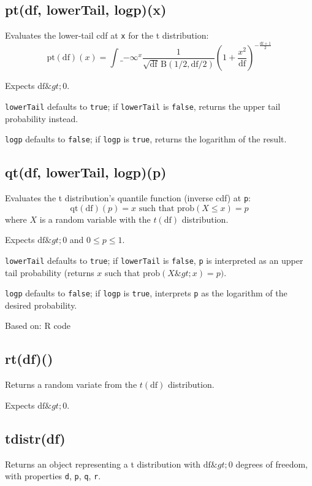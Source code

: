 \documentclass{article}
\begin{document}
    \subsection*{pt(df, lowerTail, logp)(x)}
    Evaluates the lower-tail cdf at \texttt{x} for the t distribution:
$$\textrm{pt}(\textrm{df})(x) = \int\_{-\infty}^{x} \frac{1}{\sqrt{\textrm{df}}\,\textrm{B}(1/2, \textrm{df}/2)} \left(1+\frac{x^2}{\textrm{df}} \right)^{-\frac{\textrm{df} + 1}{2}}$$


Expects $\textrm{df} \&gt; 0$.


\texttt{lowerTail} defaults to \texttt{true}; if \texttt{lowerTail} is \texttt{false}, returns
the upper tail probability instead.


\texttt{logp} defaults to \texttt{false}; if \texttt{logp} is \texttt{true}, returns the logarithm
of the result.


    \subsection*{qt(df, lowerTail, logp)(p)}
    Evaluates the t distribution's quantile function
(inverse cdf) at \texttt{p}:
$$\textrm{qt}(\textrm{df})(p) = x \textrm{ such that } \textrm{prob}(X \leq x) = p$$
where $X$ is a random variable with the $t(\textrm{df})$ distribution.


Expects $\textrm{df} \&gt; 0$ and $0 \leq p \leq 1$.


\texttt{lowerTail} defaults to \texttt{true}; if \texttt{lowerTail} is \texttt{false}, \texttt{p} is
interpreted as an upper tail probability (returns
$x$ such that $\textrm{prob}(X \&gt; x) = p)$.


\texttt{logp} defaults to \texttt{false}; if \texttt{logp} is \texttt{true}, interprets \texttt{p} as
the logarithm of the desired probability.


Based on: R code


    \subsection*{rt(df)()}
    Returns a random variate from the $t(\textrm{df})$ distribution.


Expects $\textrm{df} \&gt; 0$.


    \subsection*{tdistr(df)}
    Returns an object representing a t distribution with $\textrm{df} \&gt; 0$
degrees of freedom, with properties \texttt{d}, \texttt{p}, \texttt{q}, \texttt{r}.
\end{document}
